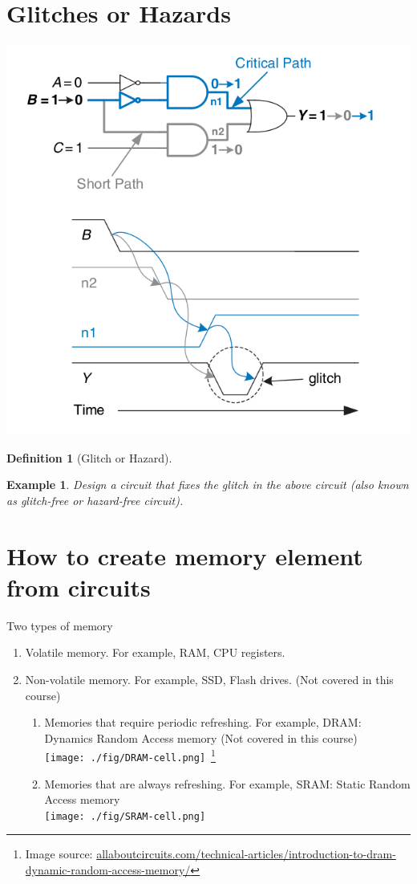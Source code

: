 \documentclass{article}
\newtheorem{example}{Example}
\newtheorem{definition}{Definition}
\begin{document}
\section{Glitches or Hazards}
\includegraphics[width=0.6\linewidth]{fig/fig2.76-timing-of-a-glitch.png}
\begin{definition}[Glitch or Hazard]

\end{definition}
\vspace{5em}

\begin{example}
  Design a circuit that fixes the glitch in the above circuit (also known as
  glitch-free or hazard-free circuit).
\end{example}
\vspace{10em}


\section{How to create memory element from circuits}

Two types of memory
\begin{enumerate}
  \item Volatile memory. For example, RAM, CPU registers.
  \item Non-volatile memory. For example, SSD, Flash drives. (Not covered in this course)
    \begin{enumerate}
    \item Memories that require periodic refreshing. For example, DRAM: Dynamics Random Access memory (Not covered in this course)\\
      \texttt{[image: ./fig/DRAM-cell.png]}~\footnote{Image
        source: \url{allaboutcircuits.com/technical-articles/introduction-to-dram-dynamic-random-access-memory/}}
    \item Memories that are always refreshing. For example, SRAM: Static Random
      Access memory~\cite[Appendix~B.64]{stephen2022fundamentals}\\
      \texttt{[image: ./fig/SRAM-cell.png]}
    \end{enumerate}
\end{enumerate}
\end{document}

